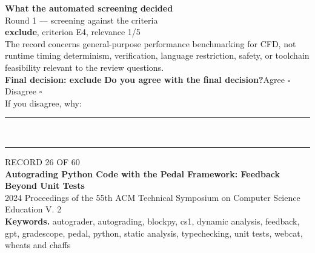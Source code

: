\documentclass[11pt,a4paper]{article}
\begin{document}
\vspace{3mm}
\vspace{2.5mm}
{\small\textbf{What the automated screening decided}}\\[2mm]
{\footnotesize\color{soft}Round 1 --- screening against the criteria}\\[0.5mm]
{\small\textbf{exclude}, criterion E4, relevance 1/5}\\[0.5mm]
{\small The record concerns general-purpose performance benchmarking for CFD, not runtime timing determinism, verification, language restriction, safety, or toolchain feasibility relevant to the review questions.}\\[2.5mm]
{\small\textbf{Final decision: exclude}}
\vspace{2mm}
{\small\textbf{Do you agree with the final decision?}\quad{}Agree $\square$\qquad{}Disagree $\square$}\\[1mm]
{\footnotesize\color{soft}If you disagree, why:}\\[1mm]
\color{rule}\rule{\linewidth}{0.3pt}\\[3mm]\rule{\linewidth}{0.3pt}\color{black}
\clearpage
{\color{soft}\footnotesize RECORD 26 OF 60}\\[1mm]
{\large\bfseries Autograding Python Code with the Pedal Framework: Feedback Beyond Unit Tests}\\[1.5mm]
{\color{soft}\small 2024 \textperiodcentered{} Proceedings of the 55th ACM Technical Symposium on Computer Science Education V. 2}\\[2mm]
{\small\textbf{Keywords.} autograder, autograding, blockpy, cs1, dynamic analysis, feedback, gpt, gradescope, pedal, python, static analysis, typechecking, unit tests, webcat, wheats and chaffs}\\[2mm]
\end{document}
